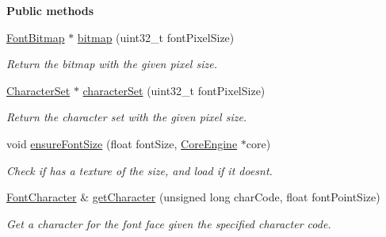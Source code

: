 \begin{Indent}\textbf{ Public methods}\par
\begin{DoxyCompactItemize}
\item 
\mbox{\label{classrev_1_1_font_face_af5d1a3ffd36763616376d3522b991e83}} 
\mbox{\hyperlink{structrev_1_1_font_bitmap}{Font\+Bitmap}} $\ast$ \mbox{\hyperlink{classrev_1_1_font_face_af5d1a3ffd36763616376d3522b991e83}{bitmap}} (uint32\+\_\+t font\+Pixel\+Size)
\begin{DoxyCompactList}\small\item\em Return the bitmap with the given pixel size. \end{DoxyCompactList}\item 
\mbox{\label{classrev_1_1_font_face_ab6b327ecdd973227d3488f9152565d7b}} 
\mbox{\hyperlink{structrev_1_1_character_set}{Character\+Set}} $\ast$ \mbox{\hyperlink{classrev_1_1_font_face_ab6b327ecdd973227d3488f9152565d7b}{character\+Set}} (uint32\+\_\+t font\+Pixel\+Size)
\begin{DoxyCompactList}\small\item\em Return the character set with the given pixel size. \end{DoxyCompactList}\item 
\mbox{\label{classrev_1_1_font_face_aea43fffbb7f8880f91c90c26d4cd4d95}} 
void \mbox{\hyperlink{classrev_1_1_font_face_aea43fffbb7f8880f91c90c26d4cd4d95}{ensure\+Font\+Size}} (float font\+Size, \mbox{\hyperlink{classrev_1_1_core_engine}{Core\+Engine}} $\ast$core)
\begin{DoxyCompactList}\small\item\em Check if has a texture of the size, and load if it doesn\textquotesingle{}t. \end{DoxyCompactList}\item 
\mbox{\label{classrev_1_1_font_face_a1fc92c1eaf9fc79e7ffe6027f77b37ee}} 
\mbox{\hyperlink{structrev_1_1_font_character}{Font\+Character}} \& \mbox{\hyperlink{classrev_1_1_font_face_a1fc92c1eaf9fc79e7ffe6027f77b37ee}{get\+Character}} (unsigned long char\+Code, float font\+Point\+Size)
\begin{DoxyCompactList}\small\item\em Get a character for the font face given the specified character code. \end{DoxyCompactList}\item 

\end{DoxyCompactItemize}
\end{Indent}
